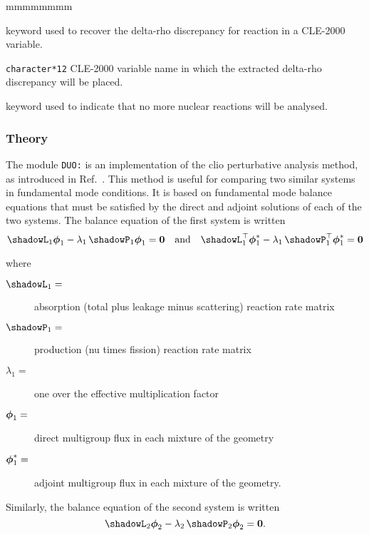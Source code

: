 \begin{ListeDeDescription}{mmmmmmmm}
\item[\moc{PICK}]  keyword used to recover the delta-rho discrepancy for reaction  in a CLE-2000 variable.

\item[\dusa{deltaRho}] \texttt{character*12} CLE-2000 variable name in which the extracted  delta-rho discrepancy will be placed.

\item[\moc{ENDREAC}] keyword used to indicate that no more nuclear reactions will be analysed.

\end{ListeDeDescription}

\subsubsection{Theory} \label{sect:theoryDUO}

The module {\tt DUO:} is an implementation of the {\sc clio} perturbative analysis method, as introduced in Ref.~. This method is useful for comparing two similar systems in fundamental mode conditions. It is based on fundamental mode balance equations that must be satisfied by the direct
and adjoint solutions of each of the two systems. The balance equation of the first system is written
\begin{equation}
\shadowL_1 \bff(\phi)_1-\lambda_1 \, \shadowP_1 \bff(\phi)_1=\bff(0) \ \ \ {\rm and} \ \ \ \shadowL_1^\top \bff(\phi)^*_1-\lambda_1 \, \shadowP^\top_1 \bff(\phi)^*_1=\bff(0)
\label{eq:duo1}
\end{equation}

\noindent where
\begin{description}
\item [$\shadowL_1=$] absorption (total plus leakage minus scattering) reaction rate matrix
\item [$\shadowP_1=$] production (nu times fission) reaction rate matrix
\item [$\lambda_1=$] one over the effective multiplication factor
\item [$\bff(\phi)_1=$] direct multigroup flux in each mixture of the geometry
\item [$\bff(\phi)^*_1=$] adjoint multigroup flux in each mixture of the geometry.
\end{description}

\vskip 0.08cm

Similarly, the balance equation of the second system is written
\begin{equation}
\shadowL_2 \bff(\phi)_2-\lambda_2 \, \shadowP_2 \bff(\phi)_2=\bff(0) .
\label{eq:duo2}
\end{equation}

